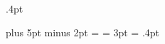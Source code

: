 \newdimen\tmpitemindent
\def\verse{\let\\=\@centercr
    \list{}{\itemsep\z@ \itemindent -1.5em \listparindent \itemindent
    \rightmargin\leftmargin\advance\leftmargin 1.5em}\item[]}
\let\endverse\endlist
\def\quotation{\list{}{\listparindent 1.5em \itemindent\listparindent
    \rightmargin\leftmargin \parsep 0pt plus 1pt}\item[]}
\let\endquotation=\endlist
\def\quote{\list{}{\rightmargin\leftmargin}\item[]}
\let\endquote=\endlist
\def\@mklab#1{#1}
\def\description{\tmpitemindent\itemindent\list{}{\itemindent\tmpitemindent
    \labelwidth\z@\def\makelabel##1{\hspace\labelsep\emph{##1}}}}
\def\enddescription{\endlist\par}
\def\enumerate{\tmpitemindent\itemindent\ifnum \@enumdepth >3 \@toodeep\else
    \advance\@enumdepth \@ne \edef\@enumctr{enum\romannumeral\the\@enumdepth}%
    \list{\csname label\@enumctr\endcsname}{\itemindent\tmpitemindent
    \usecounter{\@enumctr}\def\makelabel##1{\hspace\labelsep\hfil{##1}}}\fi}
\def\endenumerate{\endlist\par}
\def\itemize{\tmpitemindent\itemindent\ifnum \@itemdepth >3 \@toodeep\else
    \advance\@itemdepth\@ne
    \edef\@itemitem{labelitem\romannumeral\the\@itemdepth}%
    \list{\csname\@itemitem\endcsname}{\itemindent\tmpitemindent
    \def\makelabel##1{\hspace\labelsep\hfil\emph{##1}}}\fi}
\def\enditemize{\endlist\par}

\newif\if@restonecol
\def\titlepage{\@restonecolfalse\if@twocolumn\@restonecoltrue\onecolumn
    \else \newpage \fi \thispagestyle{coverpagestyle}\c@page\z@}
\def\endtitlepage{\if@restonecol\twocolumn \else \newpage \fi%
\if@twoside\mbox{}\thispagestyle{coverpagestyle}\c@page\z@\cleardoublepage\fi}

\arraycolsep     5pt
\tabcolsep       6pt
\arrayrulewidth .4pt
\doublerulesep   2pt
\tabbingsep{}

\skip\footins 10pt plus 5pt minus 2pt
\footnotesep 7pt 
\footskip 6mm
\skip\@mpfootins = \skip\footins
\fboxsep = 3pt \fboxrule = .4pt
\long\def\@makefntext#1{\parindent .8em\indent$^{\@thefnmark}$#1}
\def\footnoterule{}

